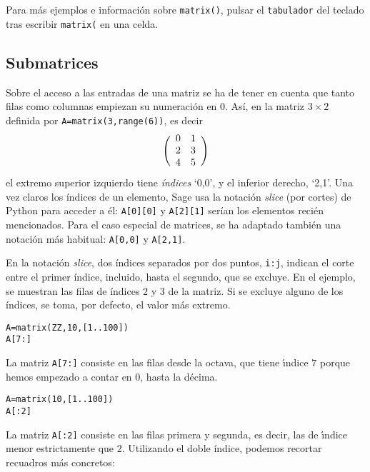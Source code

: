 Para más ejemplos e información sobre \lstinline|matrix()|, pulsar el 
\verb|tabulador| del teclado tras escribir \lstinline|matrix(| en una celda.


\subsection{Submatrices}

Sobre el acceso a las entradas de una matriz se ha de tener en cuenta que tanto
filas como columnas empiezan su numeración en $0$. Así, en la matriz $3\times2$
definida por \lstinline|A=matrix(3,range(6))|, es decir
$$
\Biggl(
\begin{array}{*2{c}}
 0 & 1 \\ 2 & 3 \\ 4 & 5
\end{array}
\Biggr)
$$
el extremo superior izquierdo tiene \emph{índices} `0,0', y el inferior derecho,
`2,1'. Una vez claros los índices de un elemento, Sage usa
la notación \emph{slice} (por cortes) de Python para acceder a él:
\lstinline|A[0][0]| y \lstinline|A[2][1]| serían los elementos recién
mencionados. Para el caso especial de matrices, se ha adaptado también una
notación más habitual: \lstinline|A[0,0]| y \lstinline|A[2,1]|. 

En la notación \emph{slice}, dos índices separados por dos puntos, %
\lstinline|i:j|, indican el corte entre el primer índice, incluido,
hasta el segundo, que se excluye. En el ejemplo, se muestran las filas de
índices $2$ y $3$ de la matriz. 
Si se excluye alguno de los índices, se toma, por defecto, el valor más
extremo. 

\begin{lstlisting}
A=matrix(ZZ,10,[1..100])
A[7:]
\end{lstlisting}
\begin{Output}
	[ 71  72  73  74  75  76  77  78  79  80]
	[ 81  82  83  84  85  86  87  88  89  90]
	[ 91  92  93  94  95  96  97  98  99 100]
\end{Output}
La matriz \lstinline|A[7:]| consiste en las filas desde la octava, que tiene
\'{\i}ndice $7$ porque hemos empezado a contar en $0$, hasta la d\'ecima.

\begin{lstlisting}
A=matrix(10,[1..100])
A[:2]
\end{lstlisting}
\begin{Output}
 	[ 1  2  3  4  5  6  7  8  9 10]
	[11 12 13 14 15 16 17 18 19 20] 
\end{Output}
La matriz \lstinline|A[:2]| consiste en las filas primera y segunda, es decir,
las de \'{\i}ndice menor estrictamente que $2$.
Utilizando el doble índice, podemos recortar recuadros más concretos:

